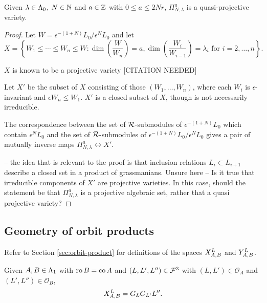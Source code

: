 \documentclass[a4paper, 11pt]{report}
\begin{document}
\begin{lemma}
Given $\lambda\in\compositions$, $N\in\naturals$ and $a\in\integers$ with $0\le a\le 2Nr$,
$\Pi_{N,\lambda}^a$ is a quasi-projective variety.
\end{lemma}

{\color{blue}
\begin{proof}
Let $W= \epsilon^{-(1+N)}L_0/{\epsilon^N L_0}$ and let
\begin{equation*}
X = \left\{W_1\le\cdots\le W_n\le W:\dim\left(\frac{W}{W_n}\right)=a, \dim\left(\frac{W_i}{W_{i-1}}\right) = \lambda_i \text{ for } i=2,\ldots,n\right\}.
\end{equation*}

$X$ is known to be a projective variety {\color{red}[CITATION NEEDED]}

Let $X'$ be the subset of $X$ consisting of those $(W_1,\ldots, W_n)$, where each $W_i$ is $\epsilon$-invariant and $\epsilon W_n \le W_1$. $X'$ is a closed subset of $X$, though is not necessarily irreducible.

The correspondence between the set of $\polys$-submodules of $\epsilon^{-(1+N)}L_0$ which contain $\epsilon^N L_0$ and the set of $\polys$-submodules of $\epsilon^{-(1+N)}L_0/{\epsilon^N L_0}$ gives a pair of mutually inverse maps $\Pi_{N,\lambda}^a\leftrightarrow X'$.

 -- the idea that is relevant to the proof is that inclusion relations $L_i\subset L_{i+1}$ describe a closed set in a product of grassmanians. Unsure here -- Is it true that irreducible components of $X'$ are projective varieties. In this case, should the statement be that $\Pi_{N,\lambda}^a$ is a projective algebraic set, rather that a quasi projective variety?
\end{proof}
}

\subsection{Geometry of orbit products}

Refer to Section \ref{sec:orbit-product} for definitions of the spaces $\xprod[L]{A,B}$ and $\yprod[L]{A,B}$.

\begin{lemma}
Given $A,B\in\matrices$ with $\ro{B}=\co{A}$ and $(L,L',L'')\in\flags^3$ with $(L,L')\in\mathcal{O}_A$ and $(L',L'')\in\mathcal{O}_B$,
\begin{equation*}
\xprod[L]{A,B} = G_L G_{L'} L''.
\end{equation*}
\end{lemma}
\end{document}
